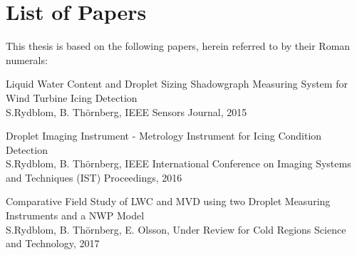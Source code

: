

\thispagestyle{plain}

\chapter*{List of Papers}
\vspace{20pt}

\noindent This thesis is based on the following papers, herein referred to by their Roman numerals:  

\newcommand{\paperone}{Liquid Water Content and Droplet Sizing Shadowgraph Measuring System for Wind Turbine Icing Detection}
\newcommand{\papertwo}{Droplet Imaging Instrument - Metrology Instrument for Icing Condition Detection}
\newcommand{\paperthree}{Comparative Field Study of LWC and MVD using two Droplet Measuring Instruments and a NWP Model}

\newcommand{\authorone}{S.Rydblom, B. Thörnberg}
\newcommand{\authortwo}{S.Rydblom, B. Thörnberg, E. Olsson}


\newcommand{\ieeesens}{IEEE Sensors Journal}
\newcommand{\ieeeconf}{IEEE International Conference on Imaging Systems and Techniques (IST) Proceedings}
\newcommand{\mst}{Measurement Science and Technology}
\newcommand{\coldreg}{Under Review for Cold Regions Science and Technology}

\begin{description}[style=nextline]
    \item[Paper I]
    \paperone \\ 
    \authorone, \ieeesens, 2015\dotfill \pageref{pap:paper1}
    
    \item[Paper II]
    \papertwo \\ 
    \authorone, \ieeeconf, 2016\dotfill \pageref{pap:paper2}
     
    \item[Paper III]
    \paperthree \\ 
    \authortwo, \coldreg, 2017\dotfill \pageref{pap:paper3}

%    
%   
%



\end{description}

